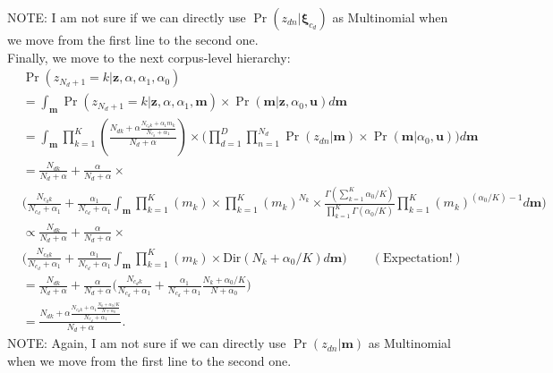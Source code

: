 \documentclass[12pt]{article}
\begin{document}
NOTE: I am not sure if we can directly use $\Pr(z_{dn}|\boldsymbol{\xi}_{c_d})$ as Multinomial when we move from the first line to the second one.\\ \newline
Finally, we move to the next corpus-level hierarchy:
\begin{equation}
\begin{aligned}
&\Pr(z_{N_d+1} = k|\boldsymbol{z}, \alpha, \alpha_1, \alpha_0) \\&= \int_{\boldsymbol{m}} \Pr(z_{N_d+1} = k|\boldsymbol{z}, \alpha, \alpha_1, \boldsymbol{m} )\times\Pr(\boldsymbol{m}|\boldsymbol{z}, \alpha_0, \boldsymbol{u})d\boldsymbol{m}\\&=\int_{\boldsymbol{m}} \prod_{k=1}^K
(\frac{N_{dk}+\alpha\frac{N_{c_dk}+\alpha_1m_k}{N_{c_d}+\alpha_1}}{N_d + \alpha})\times
\Big(\prod_{d=1}^D\prod_{n=1}^{N_d}\Pr(z_{dn}|\boldsymbol{m}) \times \Pr(\boldsymbol{m}|\alpha_0, \boldsymbol{u}) \Big)d\boldsymbol{m}\\& 
= \frac{N_{dk}}{N_d + \alpha}+\frac{\alpha}{{N_d + \alpha}}\times\\&\Big(\frac{N_{c_dk}}{N_{c_d}+\alpha_1}+\frac{\alpha_1}{N_{c_d}+\alpha_1}\int_{\boldsymbol{m}} \prod_{k=1}^K
(m_{k})\times
\prod_{k=1}^K ({m_k})^{N_{k}}\times \frac{\Gamma(\sum_{k=1}^K \alpha_0/K)}{\prod_{k=1}^K\Gamma(\alpha_0/K)}\prod_{k=1}^K (m_{k})^{(\alpha_0/K)-1}d\boldsymbol{m}\Big)\\&
\propto \frac{N_{dk}}{N_d + \alpha}+\frac{\alpha}{{N_d + \alpha}}\times\\&\Big(\frac{N_{c_dk}}{N_{c_d}+\alpha_1}+\frac{\alpha_1}{N_{c_d}+\alpha_1}\int_{\boldsymbol{m}}\prod_{k=1}^K
(m_{k})\times \mbox{Dir}(N_{k}+\alpha_0/K)d\boldsymbol{m} \Big)\quad\quad (\mbox{Expectation!})\\& = \frac{N_{dk}}{N_d + \alpha}+\frac{\alpha}{{N_d + \alpha}}\Big(\frac{N_{c_dk}}{N_{c_d}+\alpha_1}+\frac{\alpha_1}{N_{c_d}+\alpha_1}\frac{N_{k}+\alpha_0/K}{N+\alpha_0}\Big)
\\&=
\frac{N_{dk}+\alpha\frac{N_{c_dk}+\alpha_1\frac{N_{k}+\alpha_0/K}{N+\alpha_0}}{N_{c_d}+\alpha_1}}{N_d + \alpha}.
\end{aligned}
\end{equation}
NOTE: Again, I am not sure if we can directly use $\Pr(z_{dn}|\boldsymbol{m})$ as Multinomial when we move from the first line to the second one.
\end{document}
